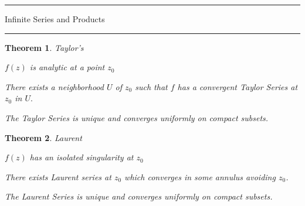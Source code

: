 \documentclass[12pt]{Qual}
\newtheorem{theorem}{Theorem}
\begin{document}
\begin{center}
\noindent\textcolor{blue!60!black}{\rule{15cm}{1mm}}
\Huge \faBug\faPuzzlePiece\faCoffee Infinite Series and Products \faCoffee\faPuzzlePiece\faBug
\vspace{-0.5cm}
\noindent\textcolor{blue!60!black}{\rule{15cm}{1mm}}
\end{center}
\vspace{0.5cm}
\begin{theorem}{\Large\textit{Taylor's}}

\begin{minipage}{0.4\textwidth}
$f(z)$ is analytic at a point $z_0$
\end{minipage}\boxed{\iff}\hspace{0.5cm}\begin{minipage}{0.4\textwidth}
There exists a neighborhood $U$ of $z_0$ such that $f$ has a convergent Taylor Series at $z_0$ in $U.$
\end{minipage}
\vspace{0.5cm}

The Taylor Series is unique and converges uniformly on compact subsets.
\end{theorem}
\vspace{0.25cm}
\begin{theorem}{\Large\textit{Laurent}}

\begin{minipage}{0.4\textwidth}
$f(z)$ has an isolated singularity at $z_0$
\end{minipage}\hspace{0.5cm}\boxed{\iff}\hspace{0.5cm}\begin{minipage}{0.4\textwidth}
There exists Laurent series at $z_0$ which converges in some annulus avoiding $z_0$.
\end{minipage}
\vspace{0.5cm}

The Laurent Series is unique and converges uniformly on compact subsets.
\end{theorem}
\vspace{0.25cm}
\end{document}
